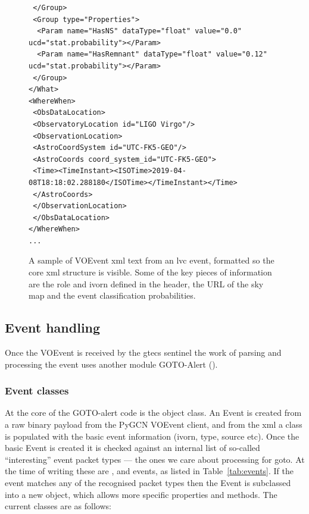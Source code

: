 \begin{colsection}
\begin{colsection}
\begin{figure}[p]
\begin{lstlisting}
 </Group>
 <Group type="Properties">
  <Param name="HasNS" dataType="float" value="0.0" ucd="stat.probability"></Param>
  <Param name="HasRemnant" dataType="float" value="0.12" ucd="stat.probability"></Param>
 </Group>
</What>
<WhereWhen>
 <ObsDataLocation>
 <ObservatoryLocation id="LIGO Virgo"/>
 <ObservationLocation>
 <AstroCoordSystem id="UTC-FK5-GEO"/>
 <AstroCoords coord_system_id="UTC-FK5-GEO">
 <Time><TimeInstant><ISOTime>2019-04-08T18:18:02.288180</ISOTime></TimeInstant></Time>
 </AstroCoords>
 </ObservationLocation>
 </ObsDataLocation>
</WhereWhen>
...
\end{lstlisting}
\caption[VOEvent XML sample]{A sample of VOEvent \gls{xml} text from an \gls{lvc} event, formatted so the core \gls{xml} structure is visible. Some of the key pieces of information are the role and \gls{ivorn} defined in the header, the URL of the sky map and the event classification probabilities.
}
\label{fig:voevent_xml}
\end{figure}

\newpage

\end{colsection}


\subsection{Event handling}
\label{sec:event_handling}
\begin{colsection}

Once the VOEvent is received by the \gls{gtecs} sentinel the work of parsing and processing the event uses another  module GOTO-Alert ().

\subsubsection{Event classes}

At the core of the GOTO-alert code is the  object class. An Event is created from a raw binary payload from the PyGCN VOEvent client, and from the \gls{xml} a  class is populated with the basic event information (\gls{ivorn}, type, source etc). Once the basic Event is created it is checked against an internal list of so-called ``interesting'' event packet types --- the ones we care about processing for \gls{goto}. At the time of writing these are ,  and  events, as listed in Table~\ref{tab:events}. If the event matches any of the recognised packet types then the Event is subclassed into a new object, which allows more specific properties and methods. The current classes are as follows:


\end{colsection}
\end{colsection}
